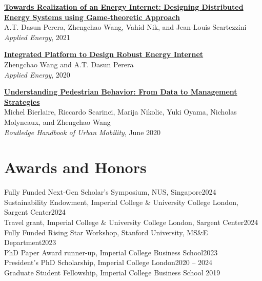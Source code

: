 \documentclass[letterpaper,11pt]{article}
\begin{document}
\begin{myitemize}
	\item \href{https://doi.org/10.1016/j.apenergy.2020.116349}{\bf  Towards Realization
of an Energy Internet: Designing Distributed Energy Systems using Game-theoretic Approach}\\{A.T. Dasun Perera, Zhengchao Wang, Vahid Nik,  and Jean-Louis Scartezzini}\\ {{\it Applied Energy},  2021}
	\item \href{https://doi.org/10.1016/j.apenergy.2020.114942}{\bf  Integrated Platform to Design Robust Energy Internet}\\{Zhengchao Wang and A.T. Dasun Perera}\\ {{\it Applied Energy},  2020}
	\item \href{https://doi.org/10.4324/9781351058759}{\bf Understanding Pedestrian Behavior: From Data to Management Strategies}\\ {Michel Bierlaire,  Riccardo Scarinci, Marija Nikolic, Yuki Oyama, Nicholas Molyneaux, and Zhengchao Wang}\\ {{\it Routledge Handbook of Urban Mobility},  June 2020}
\end{myitemize}


\section{Awards and Honors}
\begin{itemize}[leftmargin=0.15in, label={}]
	{\item{
			{{Fully Funded Next-Gen Scholar's Symposium},  NUS, Singapore}{\hfill {2024\,\,}} \\
			{{Sustainability Endowment}, Imperial College \& University College London, Sargent Center}{\hfill {2024\,\,}} \\
			{{Travel grant}, Imperial College \& University College London,  Sargent Center}{\hfill {2024\,\,}} \\
			{{Fully Funded Rising Star Workshop}, Stanford University, MS\&E Department}{\hfill {2023\,\,}} \\
			{{PhD Paper Award runner-up}, Imperial College Business School}{\hfill {2023\,\,}} \\
			{{President's PhD Scholarship}, Imperial College London}{\hfill {2020 -- 2024\,\,}} \\
			{{Graduate Student Fellowship}, }{Imperial College Business School \hfill {2019\,\,}}
	}}
\end{itemize}
\end{document}
